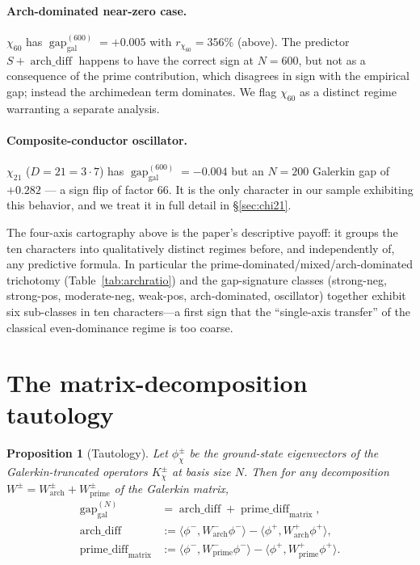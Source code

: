 \documentclass[a4paper,10pt,twocolumn]{article}
\newtheorem{proposition}[theorem]{Proposition}
\theoremstyle{definition}
\theoremstyle{remark}
\newcommand{\gap}{\operatorname{gap}}
\newcommand{\chifn}{\chi}
\newcommand{\archdiff}{\operatorname{arch\_diff}}
\newcommand{\primediff}{\operatorname{prime\_diff}_{\mathrm{matrix}}}
\begin{document}
\paragraph{Arch-dominated near-zero case.}
$\chifn_{60}$ has $\gap_{\mathrm{gal}}^{(600)}=+0.005$ with
$r_{\chifn_{60}}=356\%$ (above). The predictor $S+\archdiff$ happens
to have the correct sign at $N=600$, but not as a consequence of
the prime contribution, which disagrees in sign with the empirical
gap; instead the archimedean term dominates. We flag $\chifn_{60}$
as a distinct regime warranting a separate analysis.

\paragraph{Composite-conductor oscillator.}
$\chifn_{21}$ ($D=21=3\cdot 7$) has
$\gap_{\mathrm{gal}}^{(600)}=-0.004$ but an $N=200$ Galerkin gap of
$+0.282$ --- a sign flip of factor $66$. It is the only character in our sample exhibiting this
behavior, and we treat it in full detail in \S\ref{sec:chi21}.

\smallskip

The four-axis cartography above is the paper's descriptive payoff:
it groups the ten characters into qualitatively distinct regimes
before, and independently of, any predictive formula. In
particular the prime-dominated/mixed/arch-dominated trichotomy
(Table~\ref{tab:archratio}) and the gap-signature classes
(strong-neg, strong-pos, moderate-neg, weak-pos, arch-dominated,
oscillator) together exhibit six sub-classes in ten characters---a
first sign that the ``single-axis transfer'' of the classical
even-dominance regime \cite{RH_II} is too coarse.

\section{The matrix-decomposition tautology}
\label{sec:tautology}

\begin{proposition}[Tautology]
\label{prop:tautology}
Let $\phi^\pm_{\chifn}$ be the ground-state eigenvectors of the Galerkin-truncated
operators $K^\pm_{\chifn}$ at basis size $N$. Then for any decomposition
$W^\pm = W^\pm_{\mathrm{arch}} + W^\pm_{\mathrm{prime}}$ of the Galerkin matrix,
\[
\begin{aligned}
  \gap_{\mathrm{gal}}^{(N)}
    &= \archdiff + \primediff,\\
  \archdiff
    &:= \langle\phi^-, W^-_{\mathrm{arch}}\phi^-\rangle
      - \langle\phi^+, W^+_{\mathrm{arch}}\phi^+\rangle,\\
  \primediff
    &:= \langle\phi^-, W^-_{\mathrm{prime}}\phi^-\rangle
      - \langle\phi^+, W^+_{\mathrm{prime}}\phi^+\rangle.
\end{aligned}
\]
\end{proposition}
\end{document}
